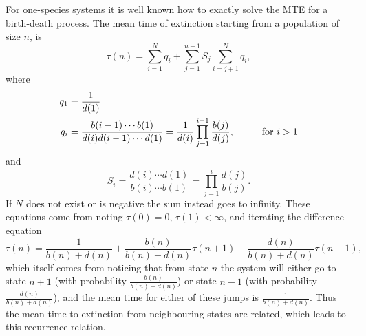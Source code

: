 For one-species systems it is well known how to exactly solve the MTE for a birth-death process. 
The mean time of extinction starting from a population of size $n$, is \cite{Nisbet1982,Palamara2013}
\begin{equation}
\tau(n) = \sum_{i=1}^{N}q_i + \sum_{j=1}^{n-1} S_j\sum_{i=j+1}^{N}q_i,
\label{analytic_mte}
\end{equation}
where
\begin{align}
q_1 &= \frac{1}{d(1)} \\
q_i &= \frac{b(i-1)\cdots b(1)}{d(i)d(i-1)\cdots d(1)} = \frac{1}{d(i)}\prod_{j=1}^{i-1}\frac{b(j)}{d(j)}, \hspace{1cm} \text{for }i > 1 \notag
\end{align}
and
\begin{equation}
S_i = \frac{d(i)\cdots d(1)}{b(i)\cdots b(1)} = \prod_{j=1}^{i}\frac{d(j)}{b(j)}.  
\end{equation}
If $N$ does not exist or is negative the sum instead goes to infinity. 
These equations come from noting $\tau(0)=0$, $\tau(1)<\infty$, and iterating the difference equation \cite{Nisbet1982,Palamara2013}
\begin{equation}
\tau(n) = \frac{1}{b(n)+d(n)} 
+ \frac{b(n)}{b(n)+d(n)}\tau(n+1) 
+ \frac{d(n)}{b(n)+d(n)}\tau(n-1),
 \label{mte-recurrence}
\end{equation}
which itself comes from noticing that from state $n$ the system will either go to state $n+1$ (with probability $\frac{b(n)}{b(n)+d(n)}$) or state $n-1$ (with probability $\frac{d(n)}{b(n)+d(n)}$), and the mean time for either of these jumps is $\frac{1}{b(n)+d(n)}$. 
Thus the mean time to extinction from neighbouring states are related, which leads to this recurrence relation. 

